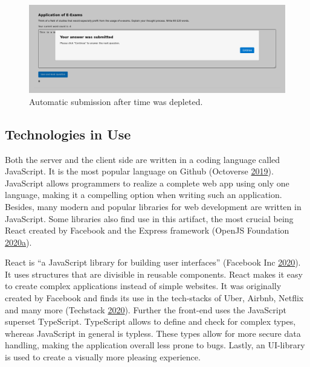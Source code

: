 \begin{figure}
\centering
\includegraphics{../figures/nextQuestionCrop.png}
\caption{Automatic submission after time was depleted.}
\end{figure}

\newpage

\hypertarget{technologies-in-use}{%
\subsection{Technologies in Use}\label{technologies-in-use}}

Both the server and the client side are written in a coding language
called JavaScript. It is the most popular language on Github (Octoverse
\protect\hyperlink{ref-Octoverse}{2019}). JavaScript allows programmers
to realize a complete web app using only one language, making it a
compelling option when writing such an application. Besides, many modern
and popular libraries for web development are written in JavaScript.
Some libraries also find use in this artifact, the most crucial being
React created by Facebook and the Express framework (OpenJS Foundation
\protect\hyperlink{ref-Express}{2020}\protect\hyperlink{ref-Express}{a}).

React is ``a JavaScript library for building user interfaces'' (Facebook
Inc \protect\hyperlink{ref-FacebookInc}{2020}). It uses structures that
are divisible in reusable components. React makes it easy to create
complex applications instead of simple websites. It was originally
created by Facebook and finds its use in the tech-stacks of Uber,
Airbnb, Netflix and many more (Techstack
\protect\hyperlink{ref-Techstack}{2020}). Further the front-end uses the
JavaScript superset TypeScript. TypeScript allows to define and check
for complex types, whereas JavaScript in general is typless. These types
allow for more secure data handling, making the application overall less
prone to bugs. Lastly, an UI-library is used to create a visually more
pleasing experience.

